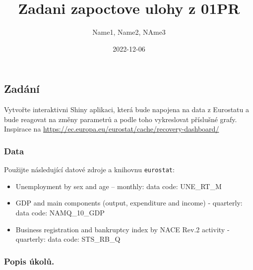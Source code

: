 \documentclass[
]{article}
\title{Zadani zapoctove ulohy z 01PR}
\author{Name1, Name2, NAme3}
\date{2022-12-06}
\providecommand{\tightlist}{%
  \setlength{\itemsep}{0pt}\setlength{\parskip}{0pt}}
\begin{document}
\maketitle

\hypertarget{zaduxe1nuxed}{%
\subsection{Zadání}\label{zaduxe1nuxed}}

Vytvořte interaktivni Shiny aplikaci, která bude napojena na data z
Eurostatu a bude reagovat na změny parametrů a podle toho vykreslovat
příslušné grafy. Inspirace na
\url{https://ec.europa.eu/eurostat/cache/recovery-dashboard/}

\hypertarget{data}{%
\subsubsection{Data}\label{data}}

Použijte následující datové zdroje a knihovnu \texttt{eurostat}:

\begin{itemize}
\tightlist
\item
  Unemployment by sex and age -- monthly: data code: UNE\_RT\_M
\item
  GDP and main components (output, expenditure and income) - quarterly:
  data code: NAMQ\_10\_GDP
\item
  Business registration and bankruptcy index by NACE Rev.2 activity -
  quarterly: data code: STS\_RB\_Q
\end{itemize}

\hypertarget{popis-uxfakolux16f.}{%
\subsubsection{Popis úkolů.}\label{popis-uxfakolux16f.}}
\end{document}
